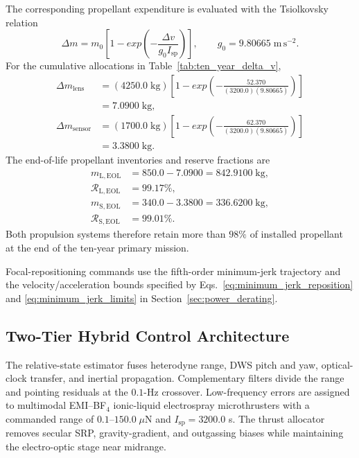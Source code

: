 \documentclass[10pt,twocolumn]{IEEEtran}
\begin{document}
The corresponding propellant expenditure is evaluated with the Tsiolkovsky
relation
\begin{equation}
\Delta m=m_0\left[1-exp\!\left(
-\frac{\Delta v}{g_0I_{\mathrm{sp}}}\right)\right],
\qquad g_0=9.80665\;\mathrm{m\,s^{-2}}.
\label{eq:gnc_tsiolkovsky}
\end{equation}
For the cumulative allocations in Table~\ref{tab:ten_year_delta_v},
\begin{equation}
\begin{aligned}
\Delta m_{\mathrm{lens}}
&=(4250.0\;\mathrm{kg})\left[1-exp\!\left(
-\frac{52.370}{(3200.0)(9.80665)}\right)\right] \\
&=7.0900\;\mathrm{kg}, \\
\Delta m_{\mathrm{sensor}}
&=(1700.0\;\mathrm{kg})\left[1-exp\!\left(
-\frac{62.370}{(3200.0)(9.80665)}\right)\right] \\
&=3.3800\;\mathrm{kg}.
\end{aligned}
\label{eq:ten_year_propellant_consumption}
\end{equation}
The end-of-life propellant inventories and reserve fractions are
\begin{equation}
\begin{aligned}
m_{\mathrm{L,EOL}}&=850.0-7.0900
=842.9100\;\mathrm{kg}, \\
\mathcal R_{\mathrm{L,EOL}}&=99.17\%, \\
m_{\mathrm{S,EOL}}&=340.0-3.3800
=336.6200\;\mathrm{kg}, \\
\mathcal R_{\mathrm{S,EOL}}&=99.01\%.
\end{aligned}
\label{eq:eol_propellant_reserve}
\end{equation}
Both propulsion systems therefore retain more than $98\%$ of installed
propellant at the end of the ten-year primary mission.

Focal-repositioning commands use the fifth-order minimum-jerk trajectory and
the velocity/acceleration bounds specified by
Eqs.~\eqref{eq:minimum_jerk_reposition} and
\eqref{eq:minimum_jerk_limits} in Section~\ref{sec:power_derating}.

\subsection{Two-Tier Hybrid Control Architecture}
\label{sec:hybrid_formation_control}

The relative-state estimator fuses heterodyne range, DWS pitch and yaw, optical-clock transfer, and inertial propagation.  Complementary filters divide the range and pointing residuals at the $0.1$-Hz crossover.  Low-frequency errors are assigned to multimodal EMI--BF$_4$ ionic-liquid electrospray microthrusters with a commanded range of $0.1$--$150.0\;\mu\mathrm{N}$ and $I_{\mathrm{sp}}=3200.0$ s.  The thrust allocator removes secular SRP, gravity-gradient, and outgassing biases while maintaining the electro-optic stage near midrange.
\end{document}
